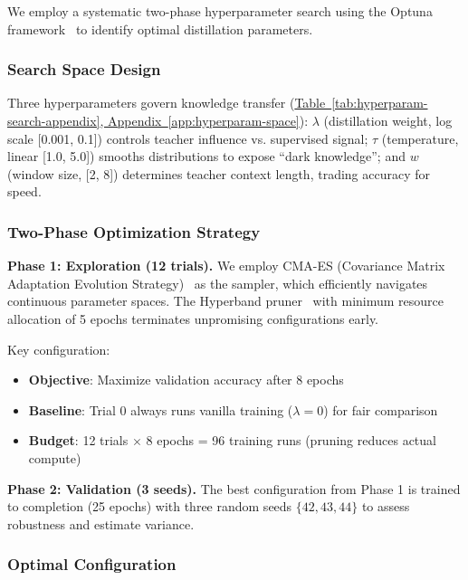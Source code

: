 We employ a systematic two-phase hyperparameter search using the Optuna framework~\cite{akibaOptunaNextgenerationHyperparameter2019} to identify optimal distillation parameters.

\subsubsection{Search Space Design}

Three hyperparameters govern knowledge transfer (\hyperref[app:hyperparam-space]{Table~\ref*{tab:hyperparam-search-appendix}, Appendix~\ref*{app:hyperparam-space}}): $\lambda$ (distillation weight, log scale [0.001, 0.1]) controls teacher influence vs. supervised signal; $\tau$ (temperature, linear [1.0, 5.0]) smooths distributions to expose ``dark knowledge''; and $w$ (window size, [2, 8]) determines teacher context length, trading accuracy for speed.

\subsubsection{Two-Phase Optimization Strategy}

\textbf{Phase 1: Exploration (12 trials).} We employ CMA-ES (Covariance Matrix Adaptation Evolution Strategy)~\cite{hansenCMAEvolutionStrategy2023} as the sampler, which efficiently navigates continuous parameter spaces. The Hyperband pruner~\cite{liHyperbandNovelBanditBased2018} with minimum resource allocation of 5 epochs terminates unpromising configurations early.

Key configuration:
\begin{itemize}[noitemsep,topsep=0pt]
\item \textbf{Objective}: Maximize validation accuracy after 8 epochs
\item \textbf{Baseline}: Trial 0 always runs vanilla training ($\lambda = 0$) for fair comparison
\item \textbf{Budget}: 12 trials $\times$ 8 epochs = 96 training runs (pruning reduces actual compute)
\end{itemize}

\textbf{Phase 2: Validation (3 seeds).} The best configuration from Phase 1 is trained to completion (25 epochs) with three random seeds $\{42, 43, 44\}$ to assess robustness and estimate variance.

\subsubsection{Optimal Configuration}

